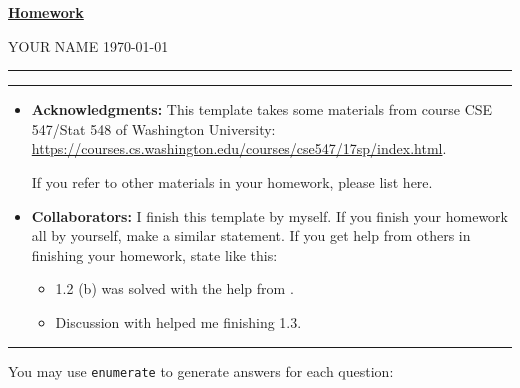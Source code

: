 \documentclass[a4paper]{article}
\begin{document}



\setcounter{hwcnt}{2} %

\begin{center}
  \underline{\bf Homework \thehwcnt} \\
\end{center}
\begin{flushleft}
  YOUR NAME\hfill
  \today
\end{flushleft}
\hrule

\vspace{2em}

\flushleft
\rule{\textwidth}{1pt}
\begin{itemize}
\item {\bf Acknowledgments: \/} 
  This template takes some materials from course CSE 547/Stat 548 of Washington University: \small{\url{https://courses.cs.washington.edu/courses/cse547/17sp/index.html}}.

  If you refer to other materials in your homework, please list here.
\item {\bf Collaborators: \/}
  I finish this template by myself. If you finish your homework all by yourself, make a similar statement. If you get help from others in finishing your homework, state like this:
  \begin{itemize}
  \item 1.2 (b) was solved with the help from \underline{\hspace{3em}}.
  \item Discussion with \underline{\hspace{3em}} helped me finishing 1.3.
  \end{itemize}
\end{itemize}
\rule{\textwidth}{1pt}

\vspace{2em}

You may use \texttt{enumerate} to generate answers for each question:
\end{document}
